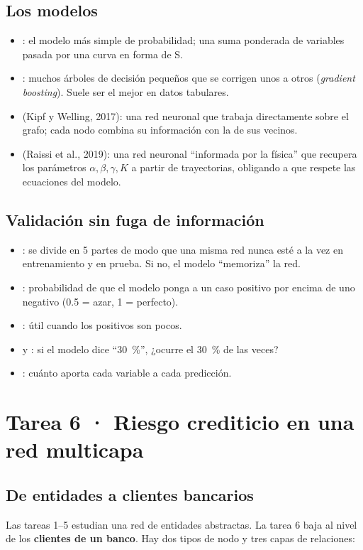 \section{Los modelos}
\begin{itemize}
\item {}: el modelo más simple de probabilidad; una suma
ponderada de variables pasada por una curva en forma de S.
\item {}: muchos árboles de decisión pequeños que se corrigen unos a otros
(\emph{gradient boosting}). Suele ser el mejor en datos tabulares.
\item {} (Kipf y Welling, 2017): una red neuronal que trabaja directamente
sobre el grafo; cada nodo combina su información con la de sus vecinos.
\item {} (Raissi et al., 2019): una red neuronal ``informada por la física''
que recupera los parámetros $\alpha,\beta,\gamma,K$ a partir de trayectorias, obligando
a que respete las ecuaciones del modelo.
\end{itemize}

\section{Validación sin fuga de información}
\begin{itemize}
\item {}: se divide en 5 partes de modo que una misma red
nunca esté a la vez en entrenamiento y en prueba. Si no, el modelo ``memoriza'' la red.
\item {}: probabilidad de que el modelo ponga a un caso positivo
por encima de uno negativo (0.5 = azar, 1 = perfecto).
\item {}: útil cuando los positivos son pocos.
\item {} y : si el modelo dice ``30~\%'', ¿ocurre el 30~\%
de las veces?
\item {}: cuánto aporta cada variable a cada predicción.
\end{itemize}

\chapter{Tarea 6 · Riesgo crediticio en una red multicapa}

\section{De entidades a clientes bancarios}
Las tareas 1–5 estudian una red de entidades abstractas. La tarea 6 baja al nivel de
los \textbf{clientes de un banco}. Hay dos tipos de nodo y tres capas de relaciones:

